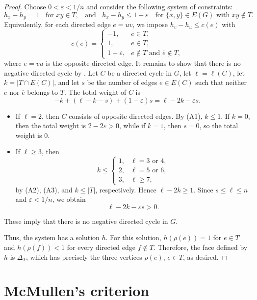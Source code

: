 \documentclass[11pt,a4paper]{amsart}
\theoremstyle{definition}
\theoremstyle{remark}
\begin{document}
{\begin{proof}
Choose $0<\varepsilon<1/n$ and consider the following system of constraints: 
\[h_x-h_y=1 \quad \text{for }xy\in T, \;\;\text{ and }\;\; h_x-h_y\le 1-\varepsilon \quad \text{for }\{x,y\} \in E(G) \text{ with }xy \not\in T.\]
Equivalently, for each directed edge $e=uv$, we impose $h_v-h_u \le c(e)$ with 
\[c(e)=
\begin{cases}
-1, & e \in T,\\ 
1, & \overline e\in T,\\
1-\varepsilon, & e\notin T \text{ and } \overline e\notin T,
\end{cases}
\]
where $\overline e=vu$ is the opposite directed edge. 
It remains to show that there is no negative directed cycle by \cite[Theorem~24.9]{CLRS}. 
Let $C$ be a directed cycle in $G$, let $\ell=\ell(C)$, let $k=|T\cap E(C)|$, and 
let $s$ be the number of edges $e\in E(C)$ such that neither $e$ nor $\overline e$ belongs to $T$. 
The total weight of $C$ is \[-k+(\ell-k-s)+(1-\varepsilon)s=\ell-2k-\varepsilon s.\]

\begin{itemize}
\item If $\ell=2$, then $C$ consists of opposite directed edges.
By (A1), $k\le1$. If $k=0$, then the total weight is $2-2\varepsilon>0$, while if $k=1$, then $s=0$, so the total weight is $0$.
\item If $\ell\ge3$, then
\[
k\le
\begin{cases}
1,&\ell=3 \text{ or } 4,\\
2,&\ell=5 \text{ or } 6,\\
3,&\ell\ge7,
\end{cases}
\]
by (A2), (A3), and $k\le|T|$, respectively.
Hence $\ell-2k\ge1$.
Since $s\le\ell\le n$ and $\varepsilon<1/n$, we obtain
\[
\ell-2k-\varepsilon s>0.
\]
\end{itemize}
These imply that there is no negative directed cycle in $G$. 

Thus, the system has a solution $h$. For this solution, $h(\rho(e))=1$ for $e\in T$ and $h(\rho(f))<1$ for every directed edge $f\notin T$. 
Therefore, the face defined by $h$ is $\Delta_T$, which has precisely the three vertices $\rho(e)$, $e\in T$, as desired.
\end{proof}


\bigskip
\section{McMullen's criterion}\label{sec:criterion}

}
\end{document}
